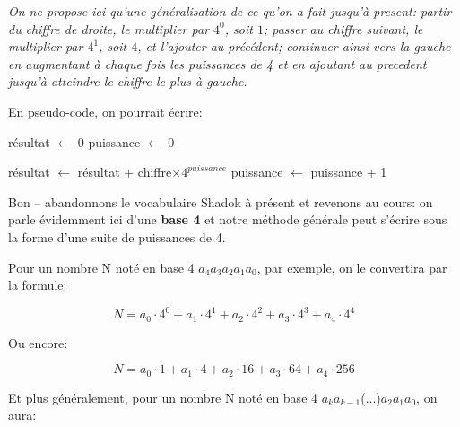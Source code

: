 \documentclass[12pt]{article}
\newenvironment{MaReponse}
		{\begin{greyedtextbox}\itshape} %
		{\end{greyedtextbox}}            %
\begin{document}
	\begin{MaReponse}
		On ne propose ici qu'une généralisation de ce qu'on a fait jusqu'à present: partir du chiffre de droite, le multiplier par $4^0$, soit $1$; passer au chiffre suivant, le multiplier par $4^1$, soit $4$, et l'ajouter au précédent; continuer ainsi vers la gauche en augmentant à chaque fois les puissances de 4 et en ajoutant au precedent jusqu'à atteindre le chiffre le plus à gauche.

		En pseudo-code, on pourrait écrire:
		
		\begin{algorithmic}[1]
			\State résultat $\leftarrow$ 0
			\State puissance $\leftarrow$ 0
			
			
			\State résultat $\leftarrow$ résultat + chiffre$\times 4^{puissance}$
			\State puissance $\leftarrow$ puissance + 1
			\EndFor
			\State{}
			\EndFunction
		\end{algorithmic}

%			
%			
	\end{MaReponse}
	
		
	Bon -- abandonnons le vocabulaire Shadok à présent et revenons au cours: on parle évidemment ici d'une \textbf{base 4} et notre méthode générale peut s'écrire sous la forme d'une suite de puissances de 4.
	
	Pour un nombre N noté en base 4 \( a_4 \)\( a_3 \)\( a_2 \)\( a_1 \)\( a_0 \), par exemple, on le convertira par la formule:
	
	\[ N = a_0 \cdot 4^0 + a_1 \cdot 4^1 + a_2 \cdot 4^2 + a_3 \cdot 4^3 + a_4 \cdot 4^4\]
	
	Ou encore:
	
	\[ N = a_0 \cdot 1 + a_1 \cdot 4 + a_2 \cdot 16 + a_3 \cdot 64 + a_4 \cdot 256\]
	
	Et plus généralement, pour un nombre N noté en base 4 \( a_k \)\( a_{k-1} \)(...)\( a_2 \)\( a_1 \)\( a_0 \), on aura:
	
\end{document}
